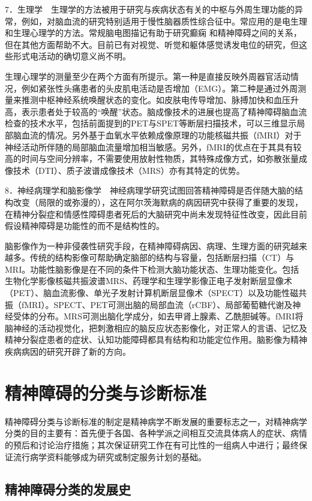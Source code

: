7．生理学　生理学的方法被用于研究与疾病状态有关的中枢与外周生理功能的异常，例如，对脑血流的研究特别适用于慢性脑器质性综合征中。常应用的是电生理和生理心理学的方法。常规脑电图描记有助于研究癫痫
和精神障碍之间的关系，但在其他方面帮助不大。目前已有对视觉、听觉和躯体感觉诱发电位的研究，但这些形式电活动的确切意义尚不明。

生理心理学的测量至少在两个方面有所提示。第一种是直接反映外周器官活动情况，例如紧张性头痛患者的头皮肌电活动是否增加（EMG）。第二种是通过外周测量来推测中枢神经系统唤醒状态的变化。如皮肤电传导增加、脉搏加快和血压升高，表示患者处于较高的“唤醒”状态。脑成像技术的进展也提高了精神障碍脑血流检查的技术水平，包括前面提到的PET与SPET等断层扫描技术，可以三维显示局部脑血流的情况。另外基于血氧水平依赖成像原理的功能核磁共振（fMRI）对于神经活动所伴随的局部脑血流量增加相当敏感。另外，fMRI的优点在于其具有较高的时间与空间分辨率，不需要使用放射性物质，其特殊成像方式，如弥散张量成像技术（DTI）、质子波谱成像技术（MRS）亦有其特定的优势。

8．神经病理学和脑影像学　神经病理学研究试图回答精神障碍是否伴随大脑的结构改变（局限的或弥漫的），这在阿尔茨海默病的病因研究中获得了重要的发现，在精神分裂症和情感性障碍患者死后的大脑研究中尚未发现特征性改变，因此目前假设精神障碍是功能性的而不是结构性的。

脑影像作为一种非侵袭性研究手段，在精神障碍病因、病理、生理方面的研究越来越多。传统的结构影像可帮助确定脑部的结构与容量，包括断层扫描（CT）与MRI。功能性脑影像是在不同的条件下检测大脑功能状态、生理功能变化。包括生物化学影像核磁共振波谱MRS、药理学和生理学影像正电子发射断层显像术（PET）、脑血流影像、单光子发射计算机断层显像术（SPECT）以及功能性磁共振（fMRI）。SPECT、PET可测出脑的局部血流（rCBF）、局部葡萄糖代谢及神经受体的分布。MRS可测出脑化学成分，如去甲肾上腺素、乙酰胆碱等。fMRI将脑神经的活动视觉化，把刺激相应的脑反应状态影像化，对正常人的言语、记忆及精神分裂症患者的症状、认知功能障碍都具有结构和功能定位作用。脑影像为精神疾病病因的研究开辟了新的方向。

\section{精神障碍的分类与诊断标准}

精神障碍分类与诊断标准的制定是精神病学不断发展的重要标志之一，对精神病学分类的目的主要有：首先便于各国、各种学派之间相互交流具体病人的症状、病情的预后和讨论治疗措施；其次保证研究工作在有可比性的一组病人中进行；最终保证流行病学资料能够成为研究或制定服务计划的基础。

\subsection{精神障碍分类的发展史}


